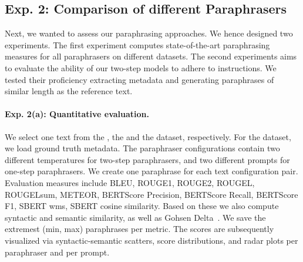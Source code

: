 \subsection{Exp. 2: Comparison of different Paraphrasers}
\label{subsec:comp_paraphrasers_setup}

Next, we wanted to assess our paraphrasing approaches.
We hence designed two experiments.
The first experiment computes state-of-the-art paraphrasing measures for all paraphrasers on different datasets.
The second experiments aims to evaluate the ability of our two-step models to adhere to instructions.
We tested their proficiency extracting metadata and generating paraphrases of similar length as the reference text.

\paragraph{Exp. 2(a): Quantitative evaluation.}

We select one text from the \dataBlog{}, the \dataGutenberg{} and the \dataStudent{} dataset, respectively.
For the \dataGutenberg{} dataset, we load ground truth metadata. %
The paraphraser configurations contain two different temperatures for two-step paraphrasers, and two different prompts for one-step paraphrasers.
We create one paraphrase for each text configuration pair.
Evaluation measures include BLEU, ROUGE1, ROUGE2, ROUGEL, ROUGELsum, METEOR, BERTScore Precision, BERTScore Recall, BERTScore F1, SBERT \ac{wms}, SBERT cosine similarity.
Based on these we also compute syntactic and semantic similarity, as well as Gohsen Delta~\citep{gohsen_captions_2023}.
We save the extremest (min, max) paraphrases per metric.
The scores are subsequently visualized via syntactic-semantic scatters, score distributions, and radar plots per paraphraser and per prompt. 

